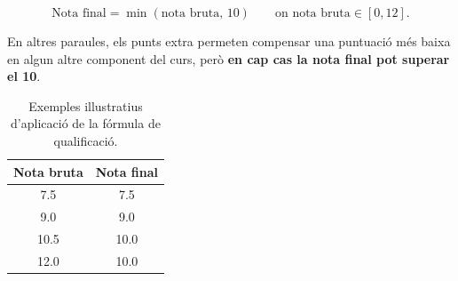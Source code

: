 \[
\text{Nota final} = \min(\text{nota bruta},\,10)
\qquad \text{on } \text{nota bruta} \in [0,12].
\]

En altres paraules, els punts extra permeten compensar una puntuaci\'o m\'es baixa en algun altre component del curs, per\`o \textbf{en cap cas la nota final pot superar el 10}.

\begin{table}[h]
  \centering
  \begin{tabular}{cc}
    \toprule
    \textbf{Nota bruta} & \textbf{Nota final} \\
    \midrule
    7.5 & 7.5 \\
    9.0 & 9.0 \\
    10.5 & 10.0 \\
    12.0 & 10.0 \\
    \bottomrule
  \end{tabular}
  \caption{Exemples il\textperiodcentered lustratius d'aplicaci\'o de la f\'ormula de qualificaci\'o.}
  \label{tab:exemples-nota}
\end{table}
